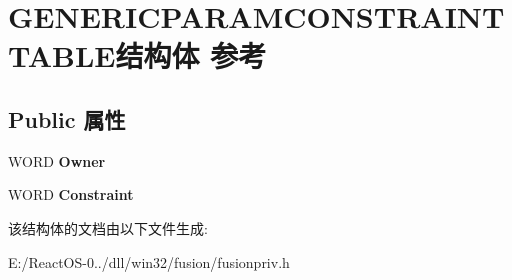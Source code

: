 \hypertarget{struct_g_e_n_e_r_i_c_p_a_r_a_m_c_o_n_s_t_r_a_i_n_t_t_a_b_l_e}{}\section{G\+E\+N\+E\+R\+I\+C\+P\+A\+R\+A\+M\+C\+O\+N\+S\+T\+R\+A\+I\+N\+T\+T\+A\+B\+L\+E结构体 参考}
\label{struct_g_e_n_e_r_i_c_p_a_r_a_m_c_o_n_s_t_r_a_i_n_t_t_a_b_l_e}
\subsection*{Public 属性}
\begin{DoxyCompactItemize}
\item 
\mbox{\label{struct_g_e_n_e_r_i_c_p_a_r_a_m_c_o_n_s_t_r_a_i_n_t_t_a_b_l_e_a8eca699e897aace7ff1d3ad13a46028f}} 
W\+O\+RD {\bfseries Owner}
\item 
\mbox{\label{struct_g_e_n_e_r_i_c_p_a_r_a_m_c_o_n_s_t_r_a_i_n_t_t_a_b_l_e_aeb6ba5d3e4cedba8b121766b58232d30}} 
W\+O\+RD {\bfseries Constraint}
\end{DoxyCompactItemize}


该结构体的文档由以下文件生成\+:\begin{DoxyCompactItemize}
\item 
E\+:/\+React\+O\+S-\/0../dll/win32/fusion/fusionpriv.\+h\end{DoxyCompactItemize}
